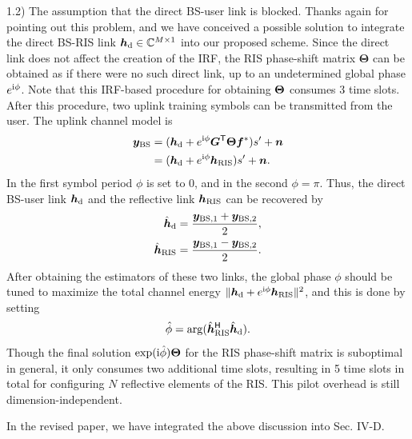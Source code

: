 \documentclass[a4paper,12pt]{article}
\def \T {^{\mathsf{T}}}
\def \H {^{\mathsf{H}}}
\def \ri {{\rm i}}
\begin{document}
{{1.2) The assumption that the direct BS-user link is blocked. Thanks again for pointing out this problem, and we have conceived a possible solution to integrate the direct BS-RIS link ${\bm h}_{\rm d}\in\mathbb{C}^{M\times 1}$ into our proposed scheme. Since the direct link does not affect the creation of the IRF, the RIS phase-shift matrix $\bm \Theta$ can be obtained as if there were no such direct link, up to an undetermined global phase $e^{\ri \phi}$. Note that this IRF-based procedure for obtaining ${\bf\Theta}$ consumes 3 time slots. After this procedure, two uplink training symbols can be transmitted from the user. The uplink channel model is 
\begin{equation}
    \begin{aligned}
        {\bm y}_{\rm BS} &= ({\bm h}_{\rm d} + e^{\ri \phi}{\bm G}\T {\bm \Theta} {\bm f}^*) s' + {\bm n} \\
        &= ({\bm h}_{\rm d} + e^{\ri \phi}{\bm h}_{\rm RIS})s' + {\bm n}.
    \end{aligned}  
\end{equation}
In the first symbol period $\phi$ is set to 0, and in the second $\phi=\pi$. Thus, the direct BS-user link ${\bm h}_{\rm d}$ and the reflective link ${\bm h}_{\rm RIS}$ can be recovered by 
\begin{equation}
    \begin{aligned}
        \hat{\bm h}_{\rm d} &= \frac{{\bm y}_{{\rm BS}, 1} + {\bm y}_{{\rm BS}, 2}}{2},\\
        \hat{\bm h}_{\rm RIS} &= \frac{{\bm y}_{{\rm BS}, 1} - {\bm y}_{{\rm BS}, 2}}{2}. 
    \end{aligned}
\end{equation}
After obtaining the estimators of these two links, the global phase $\phi$ should be tuned to maximize the total channel energy $\| {\bm h}_{\rm d} + e^{\ri \phi}{\bm h}_{\rm RIS} \|^2$, and this is done by setting 
\begin{equation}
    \hat{\phi} = \arg(\hat{\bm h}_{\rm RIS}\H \hat{\bm h}_{\rm d}).
\end{equation}
Though the final solution $\exp(\ri \hat{\phi}) {\bm \Theta}$ for the RIS phase-shift matrix is suboptimal in general, it only consumes two additional time slots, resulting in 5 time slots in total for configuring $N$ reflective elements of the RIS. This pilot overhead is still dimension-independent. 

In the revised paper, we have integrated the above discussion into Sec. IV-D.  

}}
\end{document}
